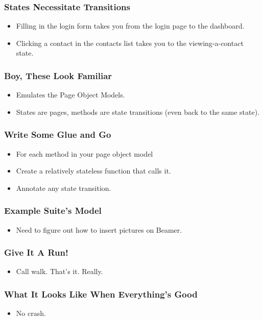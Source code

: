 \begin{frame}
  \frametitle{States Necessitate Transitions}
  \begin{itemize}
    \item Filling in the login form takes you from the login page to the dashboard.
    \item Clicking a contact in the contacts list takes you to the viewing-a-contact state.
  \end{itemize}
\end{frame}

\begin{frame}
  \frametitle{Boy, These Look Familiar}
  \begin{itemize}
    \item Emulates the Page Object Models.
    \item States are pages, methods are state transitions (even back to the same state).
  \end{itemize}
\end{frame}

\begin{frame}
  \frametitle{Write Some Glue and Go}
  \begin{itemize}
    \item For each method in your page object model
    \item Create a relatively stateless function that calls it.
    \item Annotate any state transition.
  \end{itemize}
\end{frame}

\begin{frame}
  \frametitle{Example Suite's Model}
  \begin{itemize}
    \item Need to figure out how to insert pictures on Beamer.
  \end{itemize}
\end{frame}

\begin{frame}
  \frametitle{Give It A Run!}
  \begin{itemize}
    \item Call walk. That's it. Really.
  \end{itemize}
\end{frame}

\begin{frame}
  \frametitle{What It Looks Like When Everything's Good}
  \begin{itemize}
    \item No crash.
  \end{itemize}
\end{frame}

